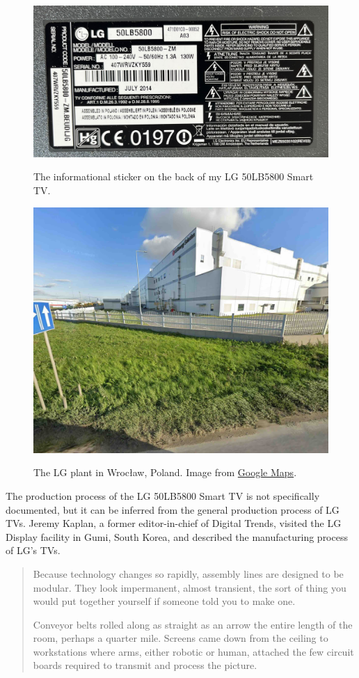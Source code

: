 \documentclass[12pt, letterpaper]{article}
\begin{document}
\begin{figure}[H]
  \medskip
  \centering
  \includegraphics[width=.75\linewidth]{lg-back-label}
  \caption{The informational sticker on the back of my LG 50LB5800 Smart TV.}
  \medskip\label{fig:lg-back-label}
\end{figure}

\begin{figure}[H]
  \medskip
  \centering
  \includegraphics[width=.75\linewidth]{lgensol-wroclaw-google-maps}
  \caption{The LG plant in Wrocław, Poland. Image from
  \href{https://maps.app.goo.gl/vMukYzKtPBX12RGo9}{Google Maps}.}
  \medskip\label{fig:lgensol-wroclaw-google-maps}
\end{figure}

The production process of the LG 50LB5800 Smart TV is not
specifically documented, but it can be inferred from the general
production process of LG TVs. Jeremy Kaplan, a former editor-in-chief of
Digital Trends, visited the LG Display facility in Gumi, South Korea,
and described the manufacturing process of LG's TVs.

\begin{quote}
  Because technology changes so rapidly, assembly lines are designed
  to be modular. They look impermanent, almost transient, the sort of
  thing you would put together yourself if someone told you to make one.

  Conveyor belts rolled along as straight as an arrow the entire
  length of the room, perhaps a quarter mile. Screens came down from
  the ceiling to workstations where arms, either robotic or human,
  attached the few circuit boards required to transmit and process the picture.
\end{quote}
\end{document}
